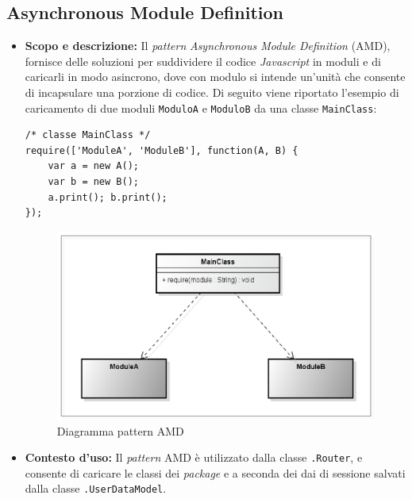 \subsection{Asynchronous Module Definition}
\begin{itemize}
\item \textbf{Scopo e descrizione:}
Il \textit{pattern} \textit{Asynchronous Module Definition} (AMD), fornisce delle soluzioni per suddividere il codice \textit{Javascript } in moduli e di caricarli in modo asincrono, dove con modulo si intende un'unità che consente di incapsulare una porzione di codice.
Di seguito viene riportato l'esempio di caricamento di due moduli \texttt{ModuloA} e \texttt{ModuloB} da una classe \texttt{MainClass}:

\begin{lstlisting}
/* classe MainClass */
require(['ModuleA', 'ModuleB'], function(A, B) {
	var a = new A();
    var b = new B();
    a.print(); b.print();
});
\end{lstlisting}

\begin{figure}[H] \centering \includegraphics[width=%
\textwidth]
{./pattern/amd.png} \caption{Diagramma pattern AMD}
\end{figure}

\item \textbf{Contesto d'uso:}
Il \textit{pattern} AMD è utilizzato dalla classe \texttt{\logic{}.Router}, e consente di caricare le classi dei \textit{package} \texttt{\logicAdmin{}} e \texttt{\logicAdmin{}} a seconda dei dai di sessione salvati dalla classe \texttt{\model{}.UserDataModel}. 
\end{itemize}